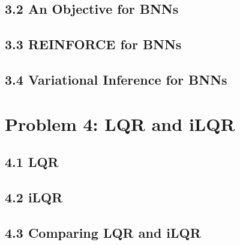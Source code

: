 \documentclass[12pt]{article}
\begin{document}
\subsection*{3.2 An Objective for BNNs}
\begin{solution}[height=5cm]
\end{solution}

\clearpage
\subsection*{3.3 REINFORCE for BNNs}
\begin{solution}[height=9cm]
\end{solution}

\subsection*{3.4 Variational Inference for BNNs}
\begin{solution}[height=9cm]
\end{solution}



\clearpage
\section*{Problem 4: LQR and iLQR}

\subsection*{4.1 LQR}
\begin{solution}[height=8cm]
\end{solution}

\subsection*{4.2 iLQR}
\begin{solution}[height=8cm]
\end{solution}

\subsection*{4.3 Comparing LQR and iLQR}
\begin{solution}[height=5cm]
\end{solution}
\end{document}
